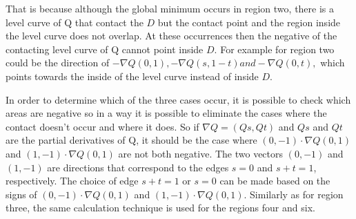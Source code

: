 That is because although the global minimum occurs in region two, there is a level curve of Q that contact the $D$ but the contact point and the region inside the level curve does not overlap. At these occurrences then the negative of the contacting level curve of Q cannot point inside $D$. For example for region two could be the direction of $-\nabla Q(0,1), -\nabla Q(s,1-t) and -\nabla Q(0,t),$ which points towards the inside of the level curve instead of inside $D$. 

In order to determine which of the three cases occur, it is possible to check which areas are negative so in a way it is possible to eliminate the cases where the contact doesn't occur and where it does. So if $\nabla Q = (Qs, Qt)$ and $Qs$ and $Qt$ are the partial derivatives of Q, it should be the case where $(0, -1) \cdot \nabla Q(0, 1)$ and $(1, -1) \cdot \nabla Q(0, 1)$ are not both  negative. The two vectors $(0, −1)$ and $(1, −1)$ are directions that correspond to the edges $s = 0$ and $s + t = 1$, respectively. The choice of edge $s+t = 1$ or $s = 0$ can be made based on the signs of $(0,-1) \cdot \nabla Q(0,1)$ and $(1, -1) \cdot \nabla Q(0, 1)$. Similarly as for region three, the same calculation technique is used for the regions four and six. 

\clearpage


